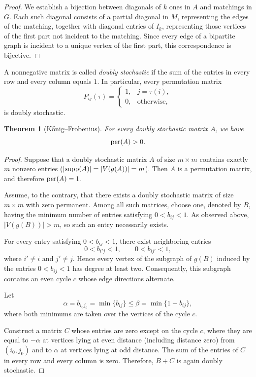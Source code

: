 \documentclass[11pt]{article}
\newtheorem{theorem}{Theorem}[section]
\theoremstyle{definition}
\newcommand{\supp}{{\rm supp}}
\newcommand{\per}{{\rm per}}
\begin{document}
{{{\begin{proof}
We establish a bijection between diagonals of $k$ ones in $A$ and
matchings in $G$.
Each such diagonal consists of a partial diagonal in $M$,
representing the edges of the matching, together with diagonal entries
of $I_k$, representing those vertices of the first part not incident
to the matching.
Since every edge of a bipartite graph is incident to a unique vertex of
the first part, this correspondence is bijective.
\end{proof}

A nonnegative matrix is called {\sl doubly stochastic} if the sum of
the entries in every row and every column equals $1$.
In particular, every permutation matrix
\[
P_{ij}(\tau)=
\left\{
\begin{array}{ll}
1,&j=\tau(i),\\
0,&\text{otherwise},
\end{array}
\right.
\]
is doubly stochastic.



\begin{theorem}[Kőnig--Frobenius]\label{mper043}
For every doubly stochastic matrix $A$, we have
\[
\per(A)>0.
\]
\end{theorem}


\begin{proof}
Suppose that a doubly stochastic matrix $A$ of size $m\times m$
contains exactly $m$ nonzero entries
($|\supp(A)|=|V(g(A))|=m$).
Then $A$ is a permutation matrix, and therefore
$\per(A)=1$.

Assume, to the contrary, that there exists a doubly stochastic matrix
of size $m\times m$ with zero permanent.
Among all such matrices, choose one, denoted by $B$, having the minimum
number of entries satisfying
$0<b_{ij}<1.
$
As observed above,
$|V(g(B))|>m$,
so such an entry necessarily exists.

For every entry satisfying $0<b_{ij}<1$, there exist neighboring
entries
\[
0<b_{i'j}<1,
\qquad
0<b_{ij'}<1,
\]
where $i'\ne i$ and $j'\ne j$.
Hence every vertex of the subgraph of $g(B)$ induced by the entries
$0<b_{ij}<1$ has degree at least two.
Consequently, this subgraph contains an even cycle $c$ whose edge
directions alternate.

Let
\[
\alpha=b_{i_0j_0}
=\min\{b_{ij}\}
\le
\beta=\min\{1-b_{ij}\},
\]
where both minimums are taken over the vertices of the cycle $c$.

Construct a matrix $C$ whose entries are zero except on the cycle $c$,
where they are equal to $-\alpha$ at vertices lying at even distance
(including distance zero) from $(i_0,j_0)$ and to $\alpha$ at vertices
lying at odd distance.
The sum of the entries of $C$ in every row and every column is zero.
Therefore,
$B+C$
is again doubly stochastic.


\end{proof}}}}
\end{document}
